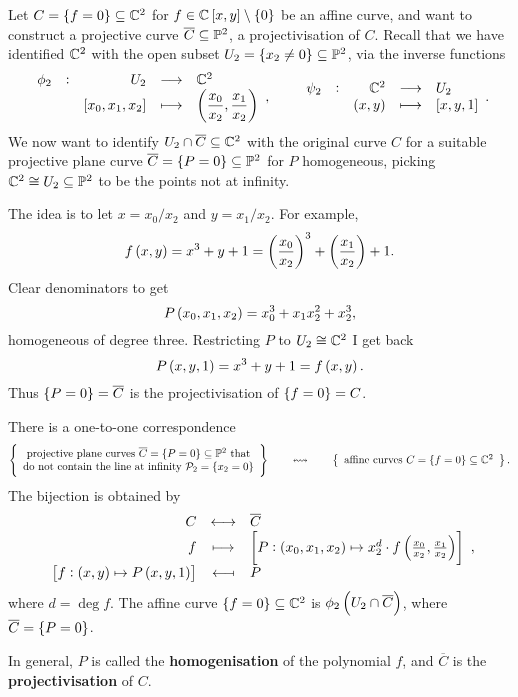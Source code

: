 Let $ C = \cbr{f = 0} \subseteq \CC^2 $ for $ f \in \CC\sbr{x, y} \setminus \cbr{0} $ be an affine curve, and want to construct a projective curve $ \overline{C} \subseteq \mathbb{P}^2 $, a projectivisation of $ C $. Recall that we have identified $ \mathbb{C}^2 $ with the open subset $ U_2 = \cbr{x_2 \ne 0} \subseteq \PP^2 $, via the inverse functions
$$ \function[\phi_2]{U_2}{\CC^2}{\sbr{x_0, x_1, x_2}}{\br{\dfrac{x_0}{x_2}, \dfrac{x_1}{x_2}}}, \qquad \function[\psi_2]{\CC^2}{U_2}{\br{x, y}}{\sbr{x, y, 1}}. $$
We now want to identify $ U_2 \cap \overline{C} \subseteq \mathbb{C}^2 $ with the original curve $ C $ for a suitable projective plane curve $ \overline{C} = \cbr{P = 0} \subseteq \PP^2 $ for $ P $ homogeneous, picking $ \mathbb{C}^2 \cong U_2 \subseteq \mathbb{P}^2 $ to be the points not at infinity.

\begin{example*}
The idea is to let $ x = x_0 / x_2 $ and $ y = x_1 / x_2 $. For example,
$$ f\br{x, y} = x^3 + y + 1 = \br{\dfrac{x_0}{x_2}}^3 + \br{\dfrac{x_1}{x_2}} + 1. $$
Clear denominators to get
$$ P\br{x_0, x_1, x_2} = x_0^3 + x_1x_2^2 + x_2^3, $$
homogeneous of degree three. Restricting $ P $ to $ U_2 \cong \mathbb{C}^2 $ I get back
$$ P\br{x, y, 1} = x^3 + y + 1 = f\br{x, y}. $$
Thus $ \cbr{P = 0} = \overline{C} $ is the projectivisation of $ \cbr{f = 0} = C $.
\end{example*}

\begin{theorem}
There is a one-to-one correspondence
$$ \correspondence{\text{projective plane curves} \ \overline{C} = \cbr{P = 0} \subseteq \PP^2 \ \text{that} \\ \text{do not contain the line at infinity} \ \PPP_2 = \cbr{x_2 = 0}}{\text{affine curves} \ C = \cbr{f = 0} \subseteq \CC^2}. $$
The bijection is obtained by
$$ \bijection{C}{\overline{C}}{f}{\sbr{P : \br{x_0, x_1, x_2} \mapsto x_2^d \cdot f\br{\tfrac{x_0}{x_2}, \tfrac{x_1}{x_2}}}}{\sbr{f : \br{x, y} \mapsto P\br{x, y, 1}}}{P}, $$
where $ d = \deg f $. The affine curve $ \cbr{f = 0} \subseteq \CC^2 $ is $ \phi_2\br{U_2 \cap \overline{C}} $, where $ \overline{C} = \cbr{P = 0} $.
\end{theorem}

\begin{notation}
In general, $ P $ is called the \textbf{homogenisation} of the polynomial $ f $, and $ \overline{C} $ is the \textbf{projectivisation} of $ C $.
\end{notation}


